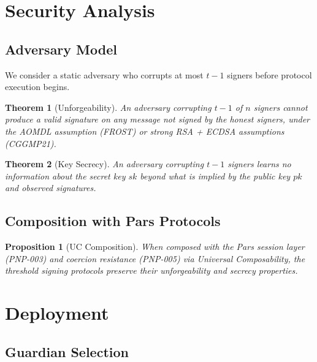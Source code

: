 \documentclass[11pt,a4paper]{article}
\newtheorem{theorem}{Theorem}[section]
\newtheorem{proposition}{Proposition}[section]
\begin{document}
\section{Security Analysis}
\label{sec:security}

\subsection{Adversary Model}

We consider a static adversary who corrupts at most $t-1$ signers
before protocol execution begins.

\begin{theorem}[Unforgeability]
    An adversary corrupting $t-1$ of $n$ signers cannot produce a valid
    signature on any message not signed by the honest signers, under the
    AOMDL assumption (FROST) or strong RSA + ECDSA assumptions (CGGMP21).
\end{theorem}

\begin{theorem}[Key Secrecy]
    An adversary corrupting $t-1$ signers learns no information about the
    secret key $sk$ beyond what is implied by the public key $pk$ and
    observed signatures.
\end{theorem}

\subsection{Composition with Pars Protocols}

\begin{proposition}[UC Composition]
    When composed with the Pars session layer (PNP-003) and coercion
    resistance (PNP-005) via Universal Composability, the threshold
    signing protocols preserve their unforgeability and secrecy
    properties.
\end{proposition}

\section{Deployment}
\label{sec:deployment}

\subsection{Guardian Selection}
\end{document}
